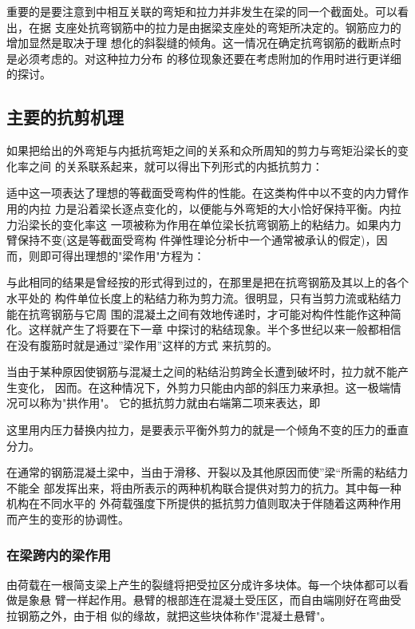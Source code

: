 \documentclass[12pt,a4paper]{book}
\begin{document}
重要的是要注意到中相互关联的弯矩和拉力并非发生在梁的同一个截面处。可以看出，在据
支座处抗弯钢筋中的拉力是由据梁支座处的弯矩所决定的。钢筋应力的增加显然是取决于理
想化的斜裂缝的倾角。这一情况在确定抗弯钢筋的截断点时是必须考虑的。对这种拉力分布
的移位现象还要在考虑附加的作用时进行更详细的探讨。

\subsection{主要的抗剪机理}

如果把给出的外弯矩与内抵抗弯矩之间的关系和众所周知的剪力与弯矩沿梁长的变化率之间
的关系联系起来，就可以得出下列形式的内抵抗剪力：

适中这一项表达了理想的等截面受弯构件的性能。在这类构件中以不变的内力臂作用的内拉
力是沿着梁长逐点变化的，以便能与外弯矩的大小恰好保持平衡。内拉力沿梁长的变化率这
一项被称为作用在单位梁长抗弯钢筋上的粘结力。如果内力臂保持不变(这是等截面受弯构
件弹性理论分析中一个通常被承认的假定)，因而，则即可得出理想的"梁作用"方程为：

与此相同的结果是曾经按的形式得到过的，在那里是把在抗弯钢筋及其以上的各个水平处的
构件单位长度上的粘结力称为剪力流。很明显，只有当剪力流或粘结力能在抗弯钢筋与它周
围的混凝土之间有效地传递时，才可能对构件性能作这种简化。这样就产生了将要在下一章
中探讨的粘结现象。半个多世纪以来一般都相信在没有腹筋时就是通过''梁作用''这样的方式
来抗剪的。

当由于某种原因使钢筋与混凝土之间的粘结沿剪跨全长遭到破坏时，拉力就不能产生变化，
因而。在这种情况下，外剪力只能由内部的斜压力来承担。这一极端情况可以称为"拱作用"。
它的抵抗剪力就由右端第二项来表达，即

这里用内压力替换内拉力，是要表示平衡外剪力的就是一个倾角不变的压力的垂直分力。

在通常的钢筋混凝土梁中，当由于滑移、开裂以及其他原因而使”梁“所需的粘结力不能全
部发挥出来，将由所表示的两种机构联合提供对剪力的抗力。其中每一种机构在不同水平的
外荷载强度下所提供的抵抗剪力值则取决于伴随着这两种作用而产生的变形的协调性。

\subsubsection{在梁跨内的梁作用}

由荷载在一根简支梁上产生的裂缝将把受拉区分成许多块体。每一个块体都可以看做是象悬
臂一样起作用。悬臂的根部连在混凝土受压区，而自由端刚好在弯曲受拉钢筋之外，由于相
似的缘故，就把这些块体称作"混凝土悬臂"。
\end{document}
